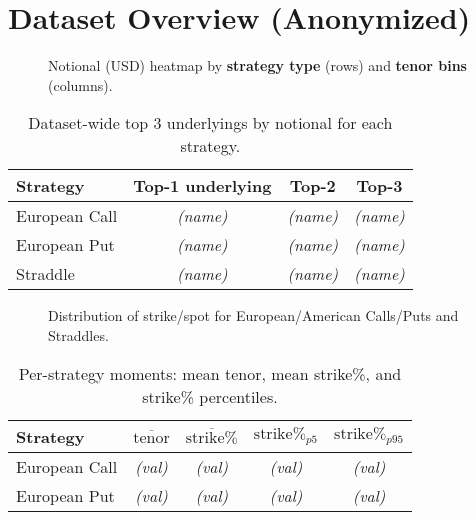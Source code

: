 \documentclass[12pt,a4paper]{report}
\begin{document}
\section{Dataset Overview (Anonymized)}
\label{sec:ds_overview}

\begin{figure}[h]
\centering
\fbox{\rule{0pt}{2.2in}\rule{.95\linewidth}{0pt}}
\caption{Notional (USD) heatmap by \textbf{strategy type} (rows) and \textbf{tenor bins} (columns).}
\label{fig:heatmap_strategy_tenor_all}
\end{figure}

\begin{table}[h]
\centering
\begin{tabular}{lccc}
\toprule
\textbf{Strategy} & \textbf{Top-1 underlying} & \textbf{Top-2} & \textbf{Top-3} \\
\midrule
European Call & \emph{(name)} & \emph{(name)} & \emph{(name)} \\
European Put  & \emph{(name)} & \emph{(name)} & \emph{(name)} \\
Straddle      & \emph{(name)} & \emph{(name)} & \emph{(name)} \\
\bottomrule
\end{tabular}
\caption{Dataset-wide top 3 underlyings by notional for each strategy.}
\label{tab:top3_underlyings_all}
\end{table}

\begin{figure}[h]
\centering
\fbox{\rule{0pt}{2.0in}\rule{.95\linewidth}{0pt}}
\caption{Distribution of strike/spot for European/American Calls/Puts and Straddles.}
\label{fig:dist_strike_spot_all}
\end{figure}

\begin{table}[h]
\centering
\begin{tabular}{lcccc}
\toprule
\textbf{Strategy} & $\overline{\text{tenor}}$ & $\overline{\text{strike\%}}$ & $\text{strike\%}_{p5}$ & $\text{strike\%}_{p95}$ \\
\midrule
European Call & \emph{(val)} & \emph{(val)} & \emph{(val)} & \emph{(val)} \\
European Put  & \emph{(val)} & \emph{(val)} & \emph{(val)} & \emph{(val)} \\
\bottomrule
\end{tabular}
\caption{Per-strategy moments: mean tenor, mean strike\%, and strike\% percentiles.}
\label{tab:per_strategy_moments_all}
\end{table}
\end{document}
